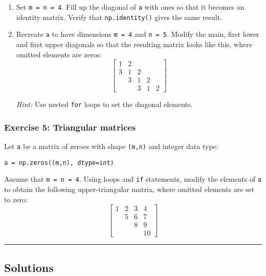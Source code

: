 \documentclass[10pt]{scrartcl}
\begin{document}
\begin{enumerate}
\def\labelenumi{\arabic{enumi}.}
\item
  Set \texttt{m\ =\ n\ =\ 4}. Fill up the diagonal of \texttt{a} with
  ones so that it becomes an identity matrix. Verify that
  \texttt{np.identity()} gives the same result.
\item
  Recreate \texttt{a} to have dimensions \texttt{m\ =\ 4} and
  \texttt{n\ =\ 5}. Modify the main, first lower and first upper
  diagonals so that the resulting matrix looks like this, where omitted
  elements are zeros: \[
  \begin{bmatrix}
  1 & 2 &   &   & \\
  3 & 1 & 2 &   & \\
    & 3 & 1 & 2 & \\
    &   & 3 & 1 & 2
  \end{bmatrix}
  \]

  \emph{Hint:} Use nested \texttt{for} loops to set the diagonal
  elements.
\end{enumerate}

    \hypertarget{exercise-5-triangular-matrices}{%
\subsubsection{Exercise 5: Triangular
matrices}\label{exercise-5-triangular-matrices}}

Let \texttt{a} be a matrix of zeroes with shape \texttt{(m,n)} and
integer data type:

\begin{verbatim}
a = np.zeros((m,n), dtype=int)
\end{verbatim}

Assume that \texttt{m\ =\ n\ =\ 4}. Using loops and \texttt{if}
statements, modify the elements of \texttt{a} to obtain the following
upper-triangular matrix, where omitted elements are set to zero: \[
\begin{bmatrix}
1 & 2 & 3 & 4  \\
 & 5 & 6 & 7  \\
  & & 8 & 9 \\
  & & & 10 
\end{bmatrix}
\]

    \begin{center}\rule{0.5\linewidth}{0.5pt}\end{center}

\hypertarget{solutions}{%
\subsection{Solutions}\label{solutions}}
\end{document}
